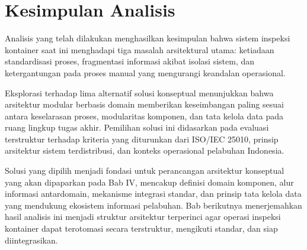 \section{Kesimpulan Analisis}

Analisis yang telah dilakukan menghasilkan kesimpulan bahwa sistem inspeksi
kontainer saat ini menghadapi tiga masalah arsitektural utama: ketiadaan
standardisasi proses, fragmentasi informasi akibat isolasi sistem, dan
ketergantungan pada proses manual yang mengurangi keandalan operasional.

Eksplorasi terhadap lima alternatif solusi konseptual menunjukkan bahwa arsitektur modular berbasis domain memberikan keseimbangan paling sesuai antara keselarasan proses, modularitas komponen, dan tata kelola data pada ruang lingkup tugas akhir. Pemilihan solusi ini didasarkan pada evaluasi terstruktur terhadap kriteria yang diturunkan dari ISO/IEC 25010, prinsip arsitektur sistem terdistribusi, dan konteks operasional pelabuhan Indonesia.

Solusi yang dipilih menjadi fondasi untuk perancangan arsitektur konseptual
yang akan dipaparkan pada Bab IV, mencakup definisi domain komponen, alur
informasi antardomain, mekanisme integrasi standar, dan prinsip tata kelola
data yang mendukung ekosistem informasi pelabuhan. Bab berikutnya menerjemahkan
hasil analisis ini menjadi struktur arsitektur terperinci agar operasi
inspeksi kontainer dapat terotomasi secara terstruktur, mengikuti standar, dan
siap diintegrasikan.
